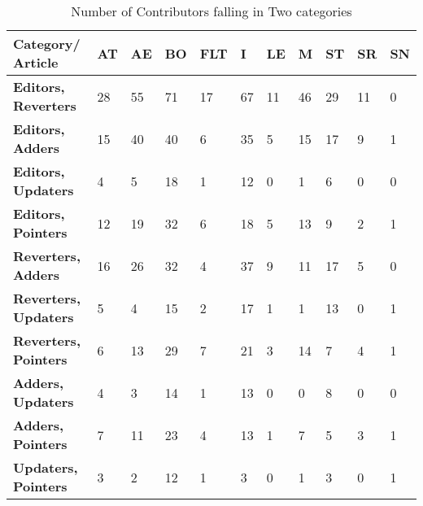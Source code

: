 \documentclass{llncs}
\begin{document}
\begin{table}[]
\centering
\begin{tabular}{T{3.5cm} T{0.7cm} T{0.7cm} T{0.7cm} T{0.7cm} T{0.7cm} T{0.7cm} T{0.7cm} T{0.7cm} T{0.7cm} T{0.7cm}}
{\bf Category/ Article} & {\bf AT} &  {\bf AE} &{\bf BO} & {\bf FLT} &  {\bf I} &  {\bf LE} &  {\bf M} &  {\bf ST} &  {\bf SR} &  {\bf SN} \\ \hline

{\bf Editors, Reverters}                             & 28  & 55  & 71  & 17  & 67  & 11  & 46  & 29  & 11  & 0  \\ 
{\bf Editors, Adders}                                & 15  & 40  & 40  & 6   & 35  & 5   & 15  & 17  & 9   & 1  \\ 
{\bf Editors, Updaters}                              & 4   & 5   & 18  & 1   & 12  & 0   & 1   & 6   & 0   & 0  \\ 
{\bf Editors, Pointers}                             & 12  & 19  & 32  & 6   & 18  & 5   & 13  & 9   & 2   & 1  \\ 
{\bf Reverters, Adders}                              & 16  & 26  & 32  & 4   & 37  & 9   & 11  & 17  & 5   & 0  \\ 
{\bf Reverters, Updaters}                            & 5   & 4   & 15  & 2   & 17  & 1   & 1   & 13  & 0   & 1  \\ 
{\bf Reverters, Pointers}                            & 6   & 13  & 29  & 7   & 21  & 3   & 14  & 7   & 4   & 1  \\ 
{\bf Adders, Updaters}                               & 4   & 3   & 14  & 1   & 13  & 0   & 0   & 8   & 0   & 0  \\ 
{\bf Adders, Pointers}                               & 7   & 11  & 23  & 4   & 13  & 1   & 7   & 5   & 3   & 1  \\ 
{\bf Updaters, Pointers}                             & 3   & 2   & 12  & 1   & 3   & 0   & 1   & 3   & 0   & 1  
  
\end{tabular}
\caption{Number of Contributors falling in Two categories}
\label{category_two}
\end{table}
\end{document}
